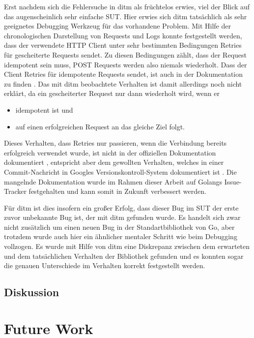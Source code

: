 \documentclass[12pt,a4paper]{report}
\begin{document}
Erst nachdem sich die Fehlersuche in ditm als früchtelos erwies, viel der Blick auf das augenscheinlich sehr einfache SUT.  Hier
erwies sich ditm tatsächlich als sehr geeignetes Debugging Werkzeug für das vorhandene Problem. Mit Hilfe der chronologischen
Darstellung von Requests und Logs konnte festgestellt werden, dass der verwendete HTTP Client unter sehr bestimmten Bedingungen
Retries für gescheiterte Requests sendet. Zu diesen Bedingungen zählt, dass der Request idempotent sein muss, POST Requests werden
also niemals wiederholt. Dass der Client Retries für idempotente Requests sendet, ist auch in der Dokumentation zu finden
\cite{go_transport_docs}. Das mit ditm beobachtete Verhalten ist damit allerdings noch nicht erklärt, da ein gescheiterter Request
nur dann wiederholt wird, wenn er
\begin{itemize}
    \item idempotent ist und
    \item auf einen erfolgreichen Request an das gleiche Ziel folgt.
\end{itemize}
Dieses Verhalten, dass Retries nur passieren, wenn die Verbindung bereits erfolgreich verwendet wurde,
ist nicht in der offiziellen Dokumentation dokumentiert \cite{go_transport_docs}, entspricht aber dem gewollten Verhalten, welches in
einer Commit-Nachricht in Googles Versionskontroll-System dokumentiert ist \cite{go_retry_commit}. Die mangelnde Dokumentation
wurde im Rahmen dieser Arbeit auf Golangs Issue-Tracker festgehalten und kann somit in Zukunft verbessert werden.

Für ditm ist dies insofern ein großer Erfolg, dass dieser Bug im SUT der erste zuvor unbekannte Bug ist, der mit ditm gefunden
wurde. Es handelt sich zwar nicht zusätzlich um einen neuen Bug in der Standartbibliothek von Go, aber trotzdem wurde auch hier
ein ähnlicher mentaler Schritt wie beim Debugging vollzogen. Es wurde mit Hilfe von ditm eine Diskrepanz zwischen dem erwarteten
und dem tatsächlichen Verhalten der Bibliothek gefunden und es konnten sogar die genauen Unterschiede im Verhalten korrekt
festgestellt werden.

\section{Diskussion}

\chapter{Future Work}
\end{document}
